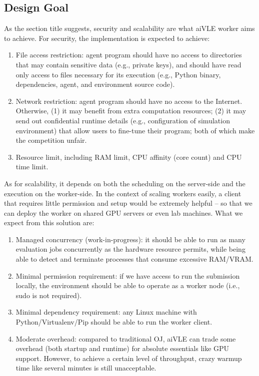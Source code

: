 \documentclass[fyp]{socreport}
\begin{document}
\subsection{Design Goal}
As the section title suggests, security and scalability are what aiVLE worker aims to achieve. For security, the implementation is expected to achieve:
\begin{enumerate}
    \item File access restriction: agent program should have no access to directories that may contain sensitive data (e.g., private keys), and should have read only access to files necessary for its execution (e.g., Python binary, dependencies, agent, and environment source code).
    \item Network restriction: agent program should have no access to the Internet. Otherwise, (1) it may benefit from extra computation resources; (2) it may send out confidential runtime details (e.g., configuration of simulation environment) that allow users to fine-tune their program; both of which make the competition unfair.
    \item Resource limit, including RAM limit, CPU affinity (core count) and CPU time limit.
\end{enumerate}

As for scalability, it depends on both the scheduling on the server-side and the execution on the worker-side. In the context of scaling workers easily, a client that requires little permission and setup would be extremely helpful – so that we can deploy the worker on shared GPU servers or even lab machines. What we expect from this solution are:
\begin{enumerate}
    \item Managed concurrency  (work-in-progress): it should be able to run as many evaluation jobs concurrently as the hardware resource permits, while being able to detect and terminate processes that consume excessive RAM/VRAM.
    \item Minimal permission requirement: if we have access to run the submission locally, the environment should be able to operate as a worker node (i.e., sudo is not required).
    \item Minimal dependency requirement: any Linux machine with Python/Virtualenv/Pip should be able to run the worker client.
    \item Moderate overhead: compared to traditional OJ, aiVLE can trade some overhead (both startup and runtime) for absolute essentials like GPU support. However, to achieve a certain level of throughput, crazy warmup time like several minutes is still unacceptable.
\end{enumerate}
\end{document}
